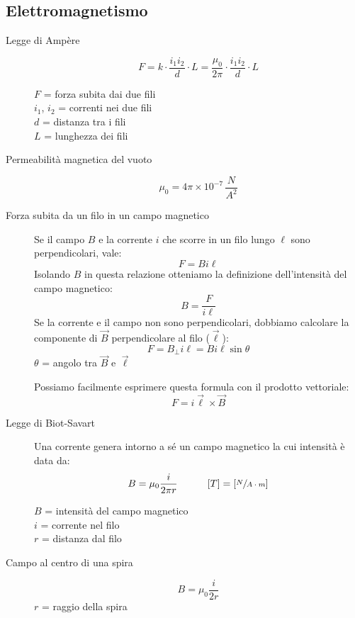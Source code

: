 \documentclass[a4paper,11pt,italian]{article}
\begin{document}
\subsection{Elettromagnetismo}

\begin{description}
  \item[Legge di Ampère]
  \[ F = k\cdot  \frac{i_1 i_2}{d}\cdot L = \frac{\mu_0}{2\pi} \cdot \frac{i_1 i_2}{d}\cdot L \]
  \begin{multicols}{2}
  $ F $ = forza subita dai due fili\\
  $ i_1 $, $ i_2 $ = correnti nei due fili\\
  $ d $ = distanza tra i fili\\
  $ L $ = lunghezza dei fili
  \end{multicols}
  
  \item[Permeabilità magnetica del vuoto]
  \[ \mu_0 = 4\pi \times 10^{-7} \, \frac{N}{A^2} \]
  
  \item[Forza subita da un filo in un campo magnetico] 
  Se il campo $ B $ e la corrente $ i $ che scorre in un filo lungo $ \ell $ sono perpendicolari, vale:\[ F = Bi\ell \]
  Isolando $ B $ in questa relazione otteniamo la definizione dell'intensità del campo magnetico:
  \[ B = \frac{F}{i\ell} \]
  Se la corrente e il campo non sono perpendicolari, dobbiamo calcolare la componente di $ \vec{B} $ perpendicolare al filo ($ \vec{\ell} $):
  \[ F = B_{\perp } i\ell = Bi\ell\sin\theta\]
  $ \theta $ = angolo tra $ \vec{B} $ e $ \vec{\ell} $
  
  Possiamo facilmente esprimere questa formula con il prodotto vettoriale:
  \[ F = i \vec{\ell} \times \vec{B} \]
  
  \item[Legge di Biot-Savart] 
  Una corrente genera intorno a sé un campo magnetico la cui intensità è data da:
  \[ B = \mu_0\dfrac{i}{2\pi r} \hspace*{3em} [T] = \left[ \sfrac{N}{A\cdot m} \right] \]
  \begin{multicols}{2}
  $ B $ = intensità del campo magnetico\\
  $ i $ = corrente nel filo\\
  $ r $ = distanza dal filo
  \end{multicols}  

  \item[Campo al centro di una spira]
  \[ B = \mu_0 \frac{i}{2r} \]
  $ r $ = raggio della spira
  

\end{description}
\end{document}
